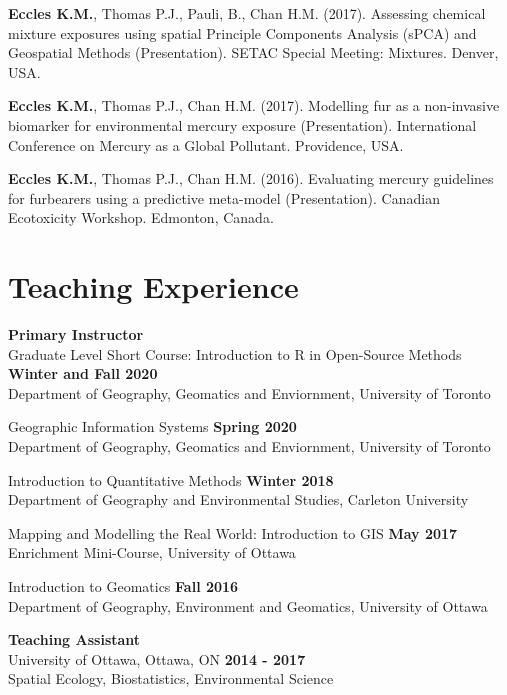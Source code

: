 \documentclass[margin,line]{res}
\begin{document}
\begin{resume}
\textbf{Eccles K.M.}, Thomas P.J., Pauli, B., Chan H.M. (2017). Assessing chemical mixture exposures using spatial Principle Components Analysis (sPCA) and Geospatial Methods (Presentation). SETAC Special Meeting: Mixtures. Denver, USA.

\textbf{Eccles K.M.}, Thomas P.J., Chan H.M. (2017).  Modelling fur as a non-invasive biomarker for environmental mercury exposure (Presentation). International Conference on Mercury as a Global Pollutant. Providence, USA.

\textbf{Eccles K.M.}, Thomas P.J., Chan H.M. (2016). Evaluating mercury guidelines for furbearers using a predictive meta-model (Presentation). Canadian Ecotoxicity Workshop. Edmonton, Canada.\\

\vspace*{.1in}
\section{\sc Teaching Experience}
\textbf{Primary Instructor}\\
Graduate Level Short Course: Introduction to R in Open-Source Methods \hfill {\textbf{Winter and Fall 2020}}\\
Department of Geography, Geomatics and Enviornment, University of Toronto

Geographic Information Systems \hfill {\textbf{Spring 2020}}\\
Department of Geography, Geomatics and Enviornment, University of Toronto

Introduction to Quantitative Methods
 \hfill {\textbf{Winter 2018}}\\
Department of Geography and Environmental Studies, Carleton University

Mapping and Modelling the Real World: Introduction to GIS \hfill {\textbf{May 2017}}\\
Enrichment Mini-Course, University of Ottawa

Introduction to Geomatics
\hfill {\textbf{Fall 2016}}\\
Department of Geography, Environment and Geomatics, University of Ottawa

\textbf{Teaching Assistant }\\
University of Ottawa, Ottawa, ON
\hfill {\textbf{2014 - 2017}}\\
Spatial Ecology, Biostatistics, Environmental Science

\vspace*{.1in}


\end{resume}
\end{document}
